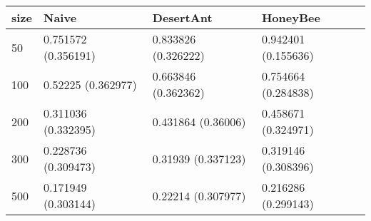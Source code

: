 \begin{tabular} {|l|l|l|l|}
\hline
size & Naive & DesertAnt & HoneyBee \\
\hline
50 & 0.751572 (0.356191)  & 0.833826 (0.326222)  & 0.942401 (0.155636)  \\
100 & 0.52225 (0.362977)  & 0.663846 (0.362362)  & 0.754664 (0.284838)  \\
200 & 0.311036 (0.332395)  & 0.431864 (0.36006)  & 0.458671 (0.324971)  \\
300 & 0.228736 (0.309473)  & 0.31939 (0.337123)  & 0.319146 (0.308396)  \\
500 & 0.171949 (0.303144)  & 0.22214 (0.307977)  & 0.216286 (0.299143)  \\
\hline
\end{tabular}
